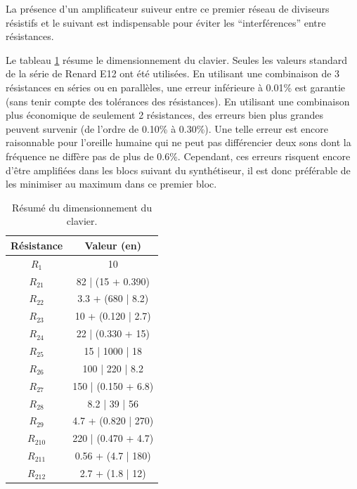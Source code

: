 La présence d'un amplificateur suiveur entre ce premier
réseau de diviseurs résistifs et le suivant est indispensable
pour éviter les ``interférences'' entre résistances.

Le tableau \ref{tab:keyboard-dim} résume le dimensionnement
du clavier. Seules les valeurs standard de la série de Renard
E12 ont été utilisées. En utilisant une combinaison de 3
résistances en séries ou en parallèles, une erreur inférieure
à 0.01\% est garantie (sans tenir compte des tolérances des
résistances). En utilisant une combinaison plus économique
de seulement 2 résistances, des erreurs bien plus grandes
peuvent survenir (de l'ordre de 0.10\% à 0.30\%). Une telle
erreur est encore raisonnable pour l'oreille humaine qui ne
peut pas différencier deux sons dont la fréquence ne diffère
pas de plus de 0.6\%\cite{frequency-jnd}. Cependant, ces erreurs
risquent encore d'être amplifiées dans les blocs suivant du
synthétiseur, il est donc préférable de les minimiser au maximum
dans ce premier bloc.

\begin{table}[ht]
	\centering
		\begin{tabular}{|c|c|}
			\hline
				Résistance & Valeur (en\unit{}{\kilo\ohm}) \\
			\hline
				$R_{1}$ & 10 \\
			\hline
				$R_{21}$ & 82 | (15 + 0.390) \\
			\hline
				$R_{22}$ & 3.3 + (680 | 8.2) \\
			\hline
				$R_{23}$ & 10 + (0.120 | 2.7) \\
			\hline
				$R_{24}$ & 22 | (0.330 + 15) \\
			\hline
				$R_{25}$ & 15 | 1000 | 18 \\
			\hline
				$R_{26}$ & 100 | 220 | 8.2 \\
			\hline
				$R_{27}$ & 150 | (0.150 + 6.8) \\
			\hline
				$R_{28}$ & 8.2 | 39 | 56 \\
			\hline
				$R_{29}$ & 4.7 + (0.820 | 270) \\
			\hline
				$R_{210}$ & 220 | (0.470 + 4.7) \\
			\hline
				$R_{211}$ & 0.56 + (4.7 | 180) \\
			\hline
				$R_{212}$ & 2.7 + (1.8 | 12) \\
			\hline
		\end{tabular}
	\caption{Résumé du dimensionnement du clavier.}
	\label{tab:keyboard-dim}
\end{table}



